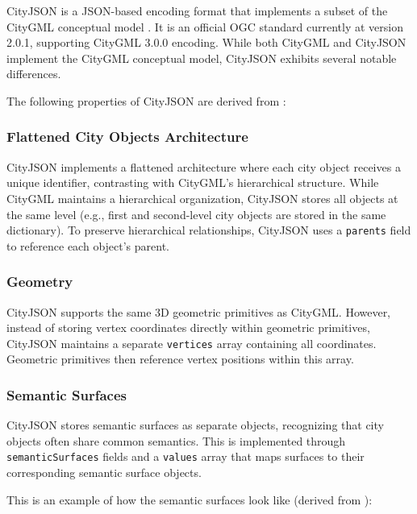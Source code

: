 CityJSON is a JSON-based \citep{json} encoding format that implements a subset of the CityGML conceptual model \citep{CityGML}. It is an official OGC standard \citep{ogc} currently at version 2.0.1, supporting CityGML 3.0.0 encoding. While both CityGML and CityJSON implement the CityGML conceptual model, CityJSON exhibits several notable differences.

The following properties of CityJSON are derived from \citet{ledoux_2019}:

\subsubsection{Flattened City Objects Architecture}
\label{rw:cityjson:flattened_architecture}

CityJSON implements a flattened architecture where each city object receives a unique identifier, contrasting with CityGML's hierarchical structure. While CityGML maintains a hierarchical organization, CityJSON stores all objects at the same level (e.g., first and second-level city objects are stored in the same dictionary). To preserve hierarchical relationships, CityJSON uses a \texttt{parents} field to reference each object's parent.

\subsubsection{Geometry}
\label{rw:cityjson:geometry}

CityJSON supports the same 3D geometric primitives as CityGML. However, instead of storing vertex coordinates directly within geometric primitives, CityJSON maintains a separate \texttt{vertices} array containing all coordinates. Geometric primitives then reference vertex positions within this array.

\subsubsection{Semantic Surfaces}
\label{rw:cityjson:semantic_surfaces}

CityJSON stores semantic surfaces as separate objects, recognizing that city objects often share common semantics. This is implemented through \texttt{semanticSurfaces} fields and a \texttt{values} array that maps surfaces to their corresponding semantic surface objects.

This is an example of how the semantic surfaces look like (derived from \citet{ledoux_2019}):

